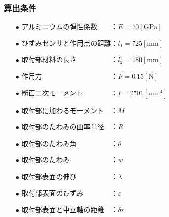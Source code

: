 \documentclass[twocolumn,a4j]{jsarticle}
\begin{document}
    \subsubsection{算出条件}
    \begin{screen}
        \begin{itemize}
            \item [$\bullet$] アルミニウムの弾性係数　　：$E = 70 \left[\mathrm{GPa}\right]$
            \item [$\bullet$] ひずみセンサと作用点の距離：$l_1 = 725 \left[\mathrm{mm}\right]$
            \item [$\bullet$] 取付部材料の長さ　　　　　：$l_2 = 180 \left[\mathrm{mm}\right]$
            \item [$\bullet$] 作用力　　　　　　　　　　：$F = 0.15 \left[\mathrm{N}\right]$              
            \item [$\bullet$] 断面二次モーメント　　　　：$I = 2701 \left[\mathrm{mm^4}\right]$              
            \item [$\bullet$] 取付部に加わるモーメント　：$M$              
            \item [$\bullet$] 取付部のたわみの曲率半径　：$R$              
            \item [$\bullet$] 取付部のたわみ角　　　　　：$\theta$
            \item [$\bullet$] 取付部のたわみ　　　　　　：$w$
            \item [$\bullet$] 取付部表面の伸び　　　　　：$\lambda$
            \item [$\bullet$] 取付部表面のひずみ　　　　：$\varepsilon$
            \item [$\bullet$] 取付部表面と中立軸の距離　：$\delta r$              
        \end{itemize}
    \end{screen}
    
\end{document}
